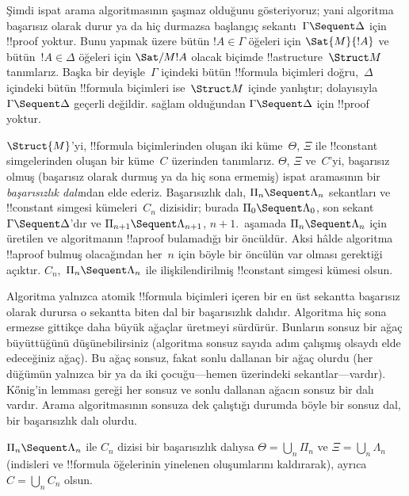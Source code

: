 \documentclass[../../../include/open-logic-section]{subfiles}
\begin{document}


Şimdi ispat arama algoritmasının şaşmaz olduğunu gösteriyoruz; yani algoritma
başarısız olarak durur ya da hiç durmazsa başlangıç sekantı~$\Gamma \Sequent
\Delta$ için !!{proof} yoktur. Bunu yapmak üzere bütün $!A \in \Gamma$
öğeleri için $\Sat{M}{!A}$ ve bütün~$!A \in \Delta$ öğeleri için
$\Sat/{M}{!A}$ olacak biçimde !!a{structure}~$\Struct M$ tanımlarız. Başka
bir deyişle~$\Gamma$ içindeki bütün !!{formula} biçimleri doğru,~$\Delta$ içindeki
bütün !!{formula} biçimleri ise~$\Struct M$ içinde yanlıştır; dolayısıyla $\Gamma
\Sequent \Delta$ geçerli değildir.  sağlam olduğundan $\Gamma
\Sequent \Delta$ için !!{proof} yoktur.

$\Struct{M}$'yi, !!{formula} biçimlerinden oluşan iki küme~$\Theta$, $\Xi$ ile
!!{constant} simgelerinden oluşan bir küme~$C$ üzerinden tanımlarız. $\Theta$, $\Xi$ ve~$C$'yi,
başarısız olmuş (başarısız olarak durmuş ya da hiç sona ermemiş) ispat
aramasının bir \emph{başarısızlık dalı}ndan elde ederiz. Başarısızlık dalı,
$\Pi_n \Sequent \Lambda_n$ sekantları ve !!{constant} simgesi kümeleri~$C_n$
dizisidir; burada $\Pi_0 \Sequent \Lambda_0$, son sekant~$\Gamma \Sequent
\Delta$'dır ve $\Pi_{n+1} \Sequent \Lambda_{n+1}$, $n+1$.~aşamada $\Pi_n
\Sequent \Lambda_n$ için üretilen ve algoritmanın !!a{proof} bulamadığı bir
öncüldür. Aksi hâlde algoritma !!a{proof} bulmuş olacağından her~$n$ için
böyle bir öncülün var olması gerektiği açıktır. $C_n$,~$\Pi_n \Sequent
\Lambda_n$ ile ilişkilendirilmiş !!{constant} simgesi kümesi olsun.

Algoritma yalnızca atomik !!{formula} biçimleri içeren bir en üst sekantta başarısız
olarak durursa o sekantta biten dal bir başarısızlık dalıdır. Algoritma hiç
sona ermezse gittikçe daha büyük ağaçlar üretmeyi sürdürür. Bunların sonsuz
bir ağaç büyüttüğünü düşünebilirsiniz (algoritma sonsuz sayıda adım çalışmış
olsaydı elde edeceğiniz ağaç). Bu ağaç sonsuz, fakat sonlu dallanan bir ağaç
olurdu (her düğümün yalnızca bir ya da iki çocuğu---hemen üzerindeki
sekantlar---vardır). K\H{o}nig'in lemması gereği her sonsuz ve sonlu dallanan
ağacın sonsuz bir dalı vardır. Arama algoritmasının sonsuza dek çalıştığı
durumda böyle bir sonsuz dal, bir başarısızlık dalı olurdu.

$\Pi_n \Sequent \Lambda_n$ ile $C_n$ dizisi bir başarısızlık dalıysa
$\Theta = \bigcup_n \Pi_n$ ve $\Xi = \bigcup_n \Lambda_n$ (indisleri ve
!!{formula} öğelerinin yinelenen oluşumlarını kaldırarak), ayrıca $C =
\bigcup_n C_n$ olsun.
\end{document}

